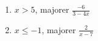 
\begin{enumerate}
\item $x > 5 $, majorer $\frac{-6}{3-4x}$
\item $x \leq -1$, majorer $\frac{2}{x-7}$
\end{enumerate}